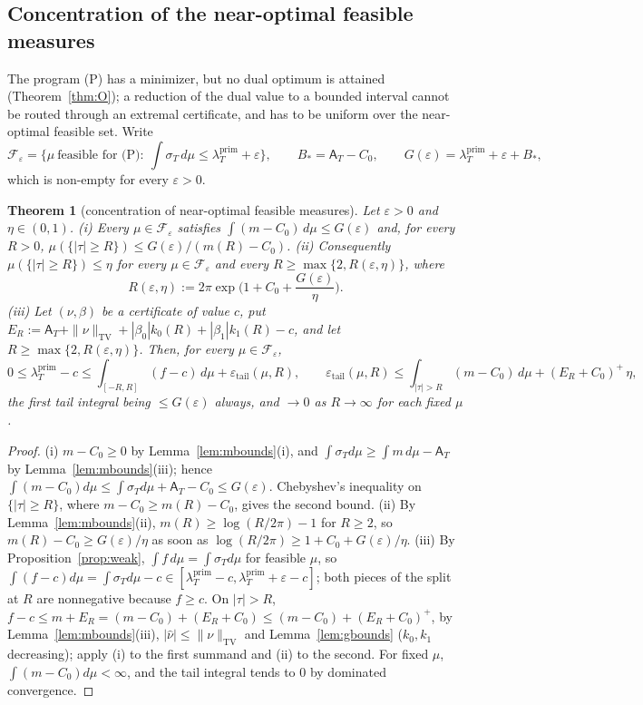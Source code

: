 \documentclass[11pt]{amsart}
\newtheorem{theorem}{Theorem}[section]
\theoremstyle{definition}
\theoremstyle{remark}
\newcommand{\TV}{\operatorname{TV}}
\newcommand{\lamP}{\lambda^{\mathrm{prim}}_T}
\newcommand{\sT}{\sigma_T}
\newcommand{\nuh}{\widehat\nu}
\newcommand{\Aconst}{\mathsf A_T}
\begin{document}
\subsection{Concentration of the near-optimal feasible measures}\label{subsec:conc}

The program (P) has a minimizer, but no dual optimum is attained (Theorem~\ref{thm:O}); a reduction of
the dual value to a bounded interval cannot be routed through an extremal certificate, and has to be
uniform over the near-optimal feasible set. Write
\[
\mathcal F_\varepsilon=\Big\{\mu\ \text{feasible for (P)}:\ \int\sT\,d\mu\le\lamP+\varepsilon\Big\},
\qquad B_*=\Aconst-C_0,\qquad G(\varepsilon)=\lamP+\varepsilon+B_*,
\]
which is non-empty for every $\varepsilon>0$.

\begin{theorem}[concentration of near-optimal feasible measures]\label{thm:P3}
Let $\varepsilon>0$ and $\eta\in(0,1)$.
\emph{(i)} Every $\mu\in\mathcal F_\varepsilon$ satisfies $\int(m-C_0)\,d\mu\le G(\varepsilon)$ and,
for every $R>0$, $\mu(\{|\tau|\ge R\})\le G(\varepsilon)/(m(R)-C_0)$.
\emph{(ii)} Consequently $\mu(\{|\tau|\ge R\})\le\eta$ for every $\mu\in\mathcal F_\varepsilon$ and
every $R\ge\max\{2,R(\varepsilon,\eta)\}$, where
\[
R(\varepsilon,\eta):=2\pi\exp\Big(1+C_0+\frac{G(\varepsilon)}\eta\Big).
\]
\emph{(iii)} Let $(\nu,\beta)$ be a certificate of value $c$, put
$E_R:=\Aconst+\|\nu\|_{\TV}+|\beta_0|k_0(R)+|\beta_1|k_1(R)-c$, and let
$R\ge\max\{2,R(\varepsilon,\eta)\}$. Then, for every $\mu\in\mathcal F_\varepsilon$,
\[
0\le\lamP-c\le\int_{[-R,R]}(f-c)\,d\mu+\varepsilon_{\mathrm{tail}}(\mu,R),\qquad
\varepsilon_{\mathrm{tail}}(\mu,R)\le\int_{|\tau|>R}(m-C_0)\,d\mu+(E_R+C_0)^+\,\eta ,
\]
the first tail integral being $\le G(\varepsilon)$ always, and $\to0$ as $R\to\infty$ for each fixed
$\mu$.
\end{theorem}
\begin{proof}
(i) $m-C_0\ge0$ by Lemma~\ref{lem:mbounds}(i), and $\int\sT d\mu\ge\int m\,d\mu-\Aconst$ by
Lemma~\ref{lem:mbounds}(iii); hence $\int(m-C_0)d\mu\le\int\sT d\mu+\Aconst-C_0\le G(\varepsilon)$.
Chebyshev's inequality on $\{|\tau|\ge R\}$, where $m-C_0\ge m(R)-C_0$, gives the second bound. (ii) By
Lemma~\ref{lem:mbounds}(ii), $m(R)\ge\log(R/2\pi)-1$ for $R\ge2$, so $m(R)-C_0\ge G(\varepsilon)/\eta$
as soon as $\log(R/2\pi)\ge1+C_0+G(\varepsilon)/\eta$. (iii) By Proposition~\ref{prop:weak},
$\int f\,d\mu=\int\sT d\mu$ for feasible $\mu$, so $\int(f-c)d\mu=\int\sT d\mu-c\in[\lamP-c,\lamP+\varepsilon-c]$;
both pieces of the split at $R$ are nonnegative because $f\ge c$. On $|\tau|>R$,
$f-c\le m+E_R=(m-C_0)+(E_R+C_0)\le(m-C_0)+(E_R+C_0)^+$, by Lemma~\ref{lem:mbounds}(iii),
$|\nuh|\le\|\nu\|_{\TV}$ and Lemma~\ref{lem:gbounds} ($k_0,k_1$ decreasing); apply (i) to the first
summand and (ii) to the second. For fixed $\mu$, $\int(m-C_0)d\mu<\infty$, and the tail integral tends to
$0$ by dominated convergence.
\end{proof}
\end{document}
